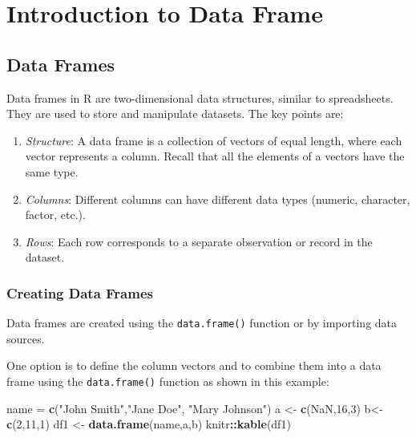 \documentclass[
]{book}
\newenvironment{Shaded}{\begin{snugshade}}{\end{snugshade}}
\newcommand{\ConstantTok}[1]{\textcolor[rgb]{0.56,0.35,0.01}{#1}}
\newcommand{\DecValTok}[1]{\textcolor[rgb]{0.00,0.00,0.81}{#1}}
\newcommand{\FunctionTok}[1]{\textcolor[rgb]{0.13,0.29,0.53}{\textbf{#1}}}
\newcommand{\NormalTok}[1]{#1}
\newcommand{\OtherTok}[1]{\textcolor[rgb]{0.56,0.35,0.01}{#1}}
\newcommand{\SpecialCharTok}[1]{\textcolor[rgb]{0.81,0.36,0.00}{\textbf{#1}}}
\newcommand{\StringTok}[1]{\textcolor[rgb]{0.31,0.60,0.02}{#1}}
\theoremstyle{definition}
\theoremstyle{definition}
\theoremstyle{definition}
\theoremstyle{definition}
\theoremstyle{remark}
\begin{document}
\hypertarget{introduction-to-data-frame}{%
\chapter{Introduction to Data Frame}\label{introduction-to-data-frame}}

\hypertarget{data-frames}{%
\section{Data Frames}\label{data-frames}}

Data frames in R are two-dimensional data structures, similar to spreadsheets. They are used to store and manipulate datasets. The key points are:

\begin{enumerate}
\def\labelenumi{\arabic{enumi}.}
\item
  \emph{Structure}: A data frame is a collection of vectors of equal length, where each vector represents a column. Recall that all the elements of a vectors have the same type.
\item
  \emph{Columns}: Different columns can have different data types (numeric, character, factor, etc.).
\item
  \emph{Rows}: Each row corresponds to a separate observation or record in the dataset.
\end{enumerate}

\hypertarget{creating-data-frames}{%
\subsection{Creating Data Frames}\label{creating-data-frames}}

Data frames are created using the \texttt{data.frame()} function or by importing data sources.

One option is to define the column vectors and to combine them into a data frame using the \texttt{data.frame()} function as shown in this example:

\begin{Shaded}
\begin{Highlighting}[]
\NormalTok{name }\OtherTok{=} \FunctionTok{c}\NormalTok{(}\StringTok{"John Smith"}\NormalTok{,}\StringTok{"Jane Doe"}\NormalTok{, }\StringTok{"Mary Johnson"}\NormalTok{)}
\NormalTok{a }\OtherTok{\textless{}{-}} \FunctionTok{c}\NormalTok{(}\ConstantTok{NaN}\NormalTok{,}\DecValTok{16}\NormalTok{,}\DecValTok{3}\NormalTok{)}
\NormalTok{b}\OtherTok{\textless{}{-}} \FunctionTok{c}\NormalTok{(}\DecValTok{2}\NormalTok{,}\DecValTok{11}\NormalTok{,}\DecValTok{1}\NormalTok{)}
\NormalTok{df1 }\OtherTok{\textless{}{-}} \FunctionTok{data.frame}\NormalTok{(name,a,b)}
\NormalTok{knitr}\SpecialCharTok{::}\FunctionTok{kable}\NormalTok{(df1)}
\end{Highlighting}
\end{Shaded}
\end{document}
